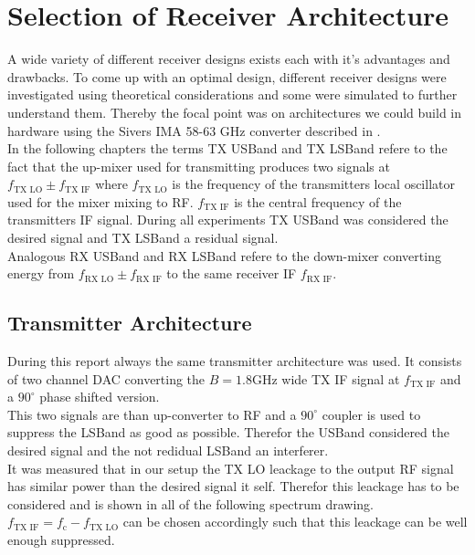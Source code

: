 \chapter{Selection of Receiver Architecture}
\label{chap:rx}

A wide variety of different receiver designs exists each with it's advantages
and drawbacks. To come up with an optimal design, different receiver designs
were investigated using theoretical considerations and some were simulated to
further understand them. Thereby the focal point was on architectures we could
build in hardware using the Sivers IMA 58-63 GHz converter described in
. \\

In the following chapters the terms \gls{TX} \gls{USBand} and \gls{TX}
\gls{LSBand} refere to the fact that the up-mixer used for transmitting
produces two signals at $f_{\text{TX LO}} \pm f_{\text{TX IF}}$ where
$f_{\text{TX LO}}$ is the frequency of the transmitters local oscillator
used for the mixer mixing to \gls{RF}. $f_{\text{TX IF}}$ is the central
frequency of the transmitters \gls{IF} signal. During all experiments
\gls{TX} \gls{USBand} was considered the desired signal and \gls{TX}
\gls{LSBand} a residual signal. \\

Analogous \gls{RX} \gls{USBand} and \gls{RX} \gls{LSBand} refere to
the down-mixer converting energy from $f_{\text{RX LO}} \pm f_{\text{RX IF}}$
to the same receiver \gls{IF} $f_{\text{RX IF}}$. \\

\section{Transmitter Architecture}
During this report always the same transmitter architecture was used.
It consists of two channel \gls{DAC} converting the $B = 1.8 \text{GHz}$ wide
\gls{TX} \gls{IF} signal at $f_{\text{TX IF}}$ and a $90^\circ$ phase shifted
version. \\

This two signals are than up-converter to
\gls{RF} and a $90^\circ$ coupler is used to suppress the \gls{LSBand}
as good as possible.
Therefor the \gls{USBand} considered the desired signal and the
not redidual \gls{LSBand} an interferer. \\

It was measured that in our setup the \gls{TX} \gls{LO} leackage
to the output \gls{RF} signal has similar power than the desired
signal it self. Therefor this leackage has to be considered and is
shown in all of the following spectrum drawing.
$f_{\text{TX IF}} = f_{\text{c}} - f_{\text{TX LO}}$ can be chosen accordingly
such that this leackage can be well enough suppressed. \\

